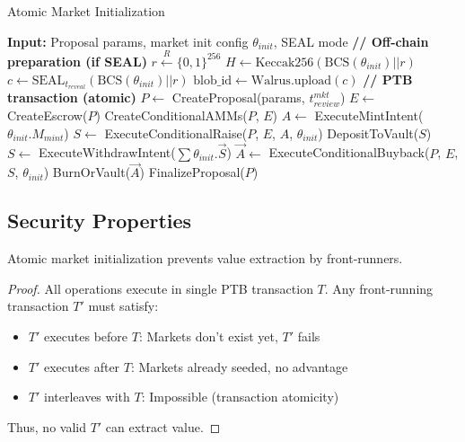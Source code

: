 \documentclass{article}
\begin{document}
\begin{algorithm}
\caption{Atomic Market Initialization}
\begin{algorithmic}
\STATE \textbf{Input:} Proposal params, market init config $\theta_{init}$, SEAL mode
\STATE
\STATE \textbf{// Off-chain preparation (if SEAL)}
    \STATE $r \xleftarrow{R} \{0,1\}^{256}$
    \STATE $H \gets \text{Keccak256}(\text{BCS}(\theta_{init}) || r)$
    \STATE $c \gets \text{SEAL}_{t_{reveal}}(\text{BCS}(\theta_{init}) || r)$
    \STATE $\text{blob\_id} \gets \text{Walrus.upload}(c)$
\ENDIF
\STATE
\STATE \textbf{// PTB transaction (atomic)}
\STATE $P \gets$ CreateProposal(params, $t_{review}^{mkt}$)
\STATE $E \gets$ CreateEscrow($P$)
\STATE CreateConditionalAMMs($P$, $E$)
\STATE
{}
    \STATE $A \gets$ ExecuteMintIntent($\theta_{init}.M_{mint}$)
    \STATE $S \gets$ ExecuteConditionalRaise($P$, $E$, $A$, $\theta_{init}$)
    \STATE DepositToVault($S$)
    \STATE $S \gets$ ExecuteWithdrawIntent($\sum \theta_{init}.\vec{S}$)
    \STATE $\vec{A} \gets$ ExecuteConditionalBuyback($P$, $E$, $S$, $\theta_{init}$)
    \STATE BurnOrVault($\vec{A}$)
\ENDIF
\STATE
\STATE FinalizeProposal($P$) 
\end{algorithmic}
\end{algorithm}

\subsection{Security Properties}

\begin{theorem}
Atomic market initialization prevents value extraction by front-runners.
\end{theorem}

\begin{proof}
All operations execute in single PTB transaction $T$. Any front-running transaction $T'$ must satisfy:
\begin{itemize}
\item $T'$ executes before $T$: Markets don't exist yet, $T'$ fails
\item $T'$ executes after $T$: Markets already seeded, no advantage
\item $T'$ interleaves with $T$: Impossible (transaction atomicity)
\end{itemize}
Thus, no valid $T'$ can extract value.
\end{proof}
\end{document}
